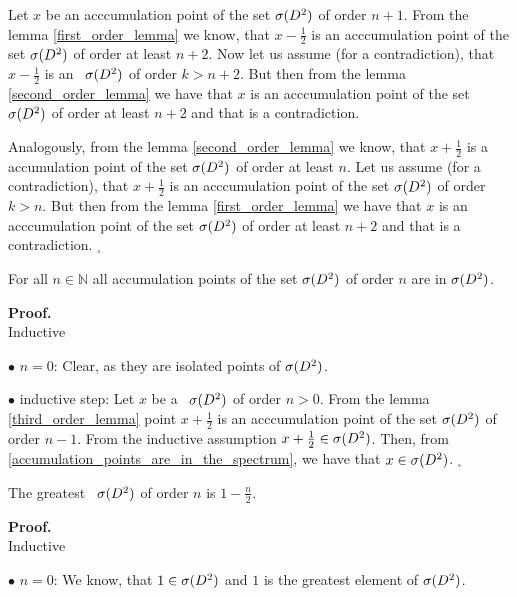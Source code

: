 Let $x$ be an acccumulation point of the set ${{\sigma}(D^2)}$ of order $n+1$. From the lemma 
 \ref{first_order_lemma} we know, that $x - \frac{1}{2}$ is an acccumulation point of the set 
 ${{\sigma}(D^2)}$ of order at least $n+2$. Now let us assume (for a contradiction), that $x - \frac{1}{2}$ 
 is an \apots\ ${{\sigma}(D^2)}$ of order $k>n+2$. But then from the lemma \ref{second_order_lemma} 
 we have that $x$ is an acccumulation point of the set ${{\sigma}(D^2)}$ of order at least $n+2$ and that 
 is a contradiction. 
 
Analogously, from the lemma \ref{second_order_lemma} we know, that $x + \frac{1}{2}$ is a 
accumulation point of the set ${{\sigma}(D^2)}$ of order at least $n$. Let us assume (for a contradiction), 
that $x+ \frac{1}{2}$ is an acccumulation point of the set ${{\sigma}(D^2)}$ of order $k>n$. But then 
from the lemma \ref{first_order_lemma} we have that $x$ is an acccumulation point of 
the set ${{\sigma}(D^2)}$ 
of order at least $n+2$ and that is a contradiction. $_\square$ 
\begin{lemma}\label{accumulation_points_of_the_set}
For all $n \in \mathbb{N}$ all accumulation points of the set ${{\sigma}(D^2)}$ of order $n$ are in ${{\sigma}(D^2)}$.
\end{lemma}
\noindent\textbf{Proof.} \\
Inductive 

$\bullet$ $n=0$: Clear, as they are isolated points of ${{\sigma}(D^2)}$. 

$\bullet$ inductive step: Let $x$ be a \apots\  ${{\sigma}(D^2)}$ of order $n>0$. From the lemma 
\ref{third_order_lemma} point $x+\frac{1}{2}$ is an acccumulation point of the set ${{\sigma}(D^2)}$  
of order $n-1$. From the inductive assumption $x+\frac{1}{2} \in {{\sigma}(D^2)}$. Then, 
from \ref{accumulation_points_are_in_the_spectrum}, we have that $x \in {{\sigma}(D^2)}$. 
$_\square$ 

\begin{theorem}\label{greatest \apots}
The greatest \apots\ ${{\sigma}(D^2)}$ of order $n$ is $1-\frac{n}{2}$.
\end{theorem}
\noindent\textbf{Proof.}\\
Inductive 

$\bullet$ $n=0$: We know, that $1\in {{\sigma}(D^2)}$ and $1$ is the greatest element of ${{\sigma}(D^2)}$. 

